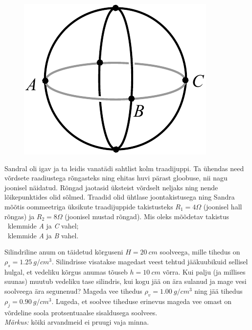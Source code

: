 \documentclass[10pt]{article}
\begin{document}
\setAuthor{}

\begin{figure}
  \vspace{-25pt}
  \begin{center}
  \includegraphics[scale=0.7]{2020-v3g-05-yl.pdf}
  \end{center}
  \vspace{-25pt}
\end{figure}
Sandral oli igav ja ta leidis vanatädi sahtlist kolm traadijuppi.
Ta ühendas need võrdsete raadiustega rõngasteks ning ehitas  huvi pärast gloobuse,
nii nagu joonisel näidatud. Rõngad jaotasid üksteist võrdselt neljaks ning nende
lõikepunktides olid sõlmed. Traadid olid ühtlase joontakistusega ning Sandra mõõtis
oommeetriga üksikute traadijuppide takistusteks $R_1=\SI{4}\Omega$ (joonisel hall
rõngas) ja $R_2=\SI{8}\Omega$ (joonisel mustad rõngad). Mis oleks mõõdetav takistus \\
\osa~klemmide \emph{A} ja \emph{C} vahel;\\
\osa~klemmide \emph{A} ja \emph{B} vahel.\\
\probend
\bigskip


Silindriline anum on täidetud kõrguseni $H=\SI{20}{cm}$ soolveega, mille tihedus on $\rho_s=\SI{1.25}{g/cm^3}$. Silindrisse visatakse magedast veest tehtud jääkuubikuid sellisel hulgal, et vedeliku kõrgus anumas tõuseb $h=\SI{10}{cm}$ võrra. Kui palju (ja millises suunas) muutub vedeliku tase silindris, kui kogu jää on ära sulanud ja mage vesi soolveega ära segunenud? Mageda vee tihedus  $\rho_v=\SI{1.00}{g/cm^3}$ ning jää tihedus  $\rho_j=\SI{0.90}{g/cm^3}$. Lugeda, et soolvee tiheduse erinevus mageda vee omast on võrdeline soola protsentuaalse sisaldusega soolvees. \\
\emph{Märkus:} kõiki arvandmeid ei pruugi vaja minna.
\probend
\bigskip
\end{document}
